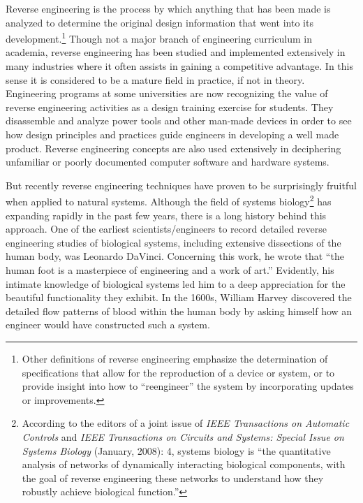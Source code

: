 Reverse engineering is the process by which anything that has been made
is analyzed to determine the original design information that went into
its development.\footnote{
Other definitions of reverse engineering emphasize
the determination of specifications that allow for the reproduction of
a device or system, or to provide insight into how to “reengineer” the
system by incorporating updates or improvements.
} Though not a major branch of
engineering curriculum in academia, reverse engineering has been
studied and implemented extensively in many industries where it often
assists in gaining a competitive advantage. In this sense it is
considered to be a mature field in practice, if not in theory.
Engineering programs at some universities are now recognizing the value
of reverse engineering activities as a design training exercise for
students.\citep[][pgs. 57--59]{wu2008}
They disassemble and analyze power tools
and other man-made devices in order to see how design principles and
practices guide engineers in developing a well made product. Reverse
engineering concepts are also used extensively in deciphering
unfamiliar or poorly documented computer software and hardware
systems.\citep{eilam2005}

But recently reverse engineering techniques have proven to be
surprisingly fruitful when applied to natural systems. Although the
field of systems biology\footnote{
According to the editors of a joint issue of
\textit{IEEE Transactions on Automatic Controls }and\textit{ IEEE
Transactions on Circuits and Systems: Special Issue on Systems Biology
}(January, 2008): 4, systems biology is “the quantitative analysis of
networks of dynamically interacting biological components, with the
goal of reverse engineering these networks to understand how they
robustly achieve biological function.”
} has expanding rapidly in
the past few years, there is a long history behind this approach. One
of the earliest scientists/engineers to record detailed reverse
engineering studies of biological systems, including extensive
dissections of the human body, was Leonardo DaVinci. Concerning this
work, he wrote that “the human foot is a masterpiece of engineering and
a work of art.” Evidently, his intimate knowledge of biological systems
led him to a deep appreciation for the beautiful functionality they
exhibit. In the 1600s, William Harvey discovered the detailed flow
patterns of blood within the human body by asking himself how an
engineer would have constructed such a system.\citep{auffraynoble2009}



